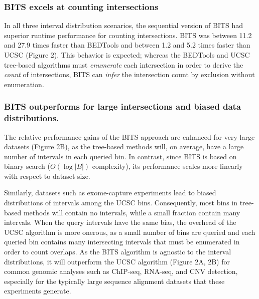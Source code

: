 \documentclass{bioinfo}
\begin{document}
\subsubsection{BITS excels at counting intersections}

In all three interval distribution scenarios, the sequential version of BITS had
superior runtime performance for counting intersections.  BITS was between 11.2
and 27.9 times faster than BEDTools and between 1.2 and 5.2 times faster than
UCSC (Figure 2). This behavior is expected; whereas the BEDTools and UCSC
tree-based algorithms must \emph{enumerate} each intersection in order to derive
the \emph{count} of intersections, BITS can \emph{infer} the intersection count
by exclusion without enumeration.

\subsubsection{BITS outperforms for large intersections and biased data
distributions.}
The relative performance gains of the BITS approach are enhanced for very large
datasets (Figure 2B), as the tree-based methods will, on average, have a large
number of intervals in each queried bin. In contrast, since BITS is based on
binary search ($O(\log |B|)$ complexity), its performance scales more linearly
with respect to dataset size.

Similarly, datasets such as exome-capture experiments lead to biased
distributions of intervals among the UCSC bins. Consequently, most bins in
tree-based methods will contain no intervals, while a small fraction contain
many intervals. When the query intervals have the same bias, the overhead of the
UCSC algorithm is more onerous, as a small number of bins are queried and each
queried bin contains many intersecting intervals that must be enumerated in
order to count overlaps. As the BITS algorithm is agnostic to the interval
distributions, it will outperform the UCSC algorithm (Figure 2A, 2B) for common
genomic analyses such as ChIP-seq, RNA-seq, and CNV detection, especially for
the typically large sequence alignment datasets that these experiments generate.



\end{document}
